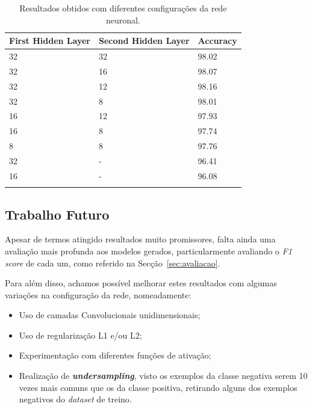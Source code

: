 \documentclass[]{article}
\begin{document}
\begin{table}[t!]
\centering
  \begin{tabular}{lll}
  \hline
  First Hidden Layer & Second Hidden Layer & Accuracy \\ \hline
  32                 & 32                  & 98.02    \\
  32                 & 16                  & 98.07    \\
  32                 & 12                  & 98.16    \\
  32                 & 8                   & 98.01    \\
  16                 & 12                  & 97.93    \\
  16                 & 8                   & 97.74    \\
  8                  & 8                   & 97.76    \\
  32                 & -                   & 96.41    \\
  16                 & -                   & 96.08    \\ \hline \\
  \end{tabular}
  \caption{Resultados obtidos com diferentes configurações da rede neuronal.}
  \label{tab:resultados}
\end{table}

\subsection{Trabalho Futuro}
Apesar de termos atingido resultados muito promissores, falta ainda uma avaliação mais profunda aos modelos gerados, particularmente avaliando o \textit{F1 score} de cada um, como referido na Secção~\ref{sec:avaliacao}.

Para além disso, achamos possível melhorar estes resultados com algumas variações na configuração da rede, nomeadamente:
\begin{itemize}
  \item Uso de camadas Convolucionais unidimensionais;
  \item Uso de regularização L1 e/ou L2;
  \item Experimentação com diferentes funções de ativação;
  \item Realização de \textbf{\textit{undersampling}}, visto os exemplos da classe negativa serem 10 vezes mais comuns que os da classe positiva, retirando alguns dos exemplos negativos do \textit{dataset} de treino.
\end{itemize}
\end{document}
